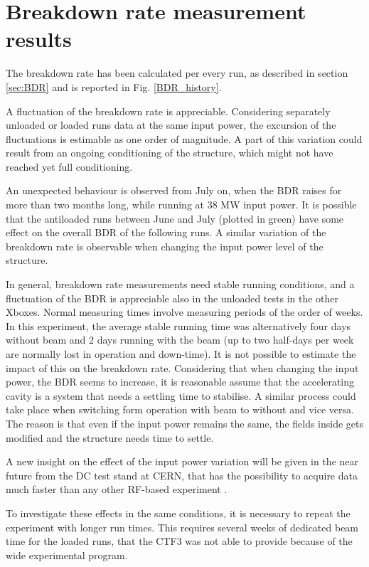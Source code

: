 \section[Breakdown rate measurement results]{Breakdown rate measurement results}

The breakdown rate has been calculated per every run, as described in section \ref{sec:BDR} and is reported in Fig. \ref{BDR_history}. 

A fluctuation of the breakdown rate is appreciable. Considering separately unloaded or loaded runs data at the same input power, the excursion of the fluctuations is estimable as one order of magnitude. A part of this variation could result from an ongoing conditioning of the structure, which might not have reached yet full conditioning.

An unexpected behaviour is observed from July on, when the BDR raises for more than two months long, while running at 38 MW input power. It is possible that the antiloaded runs between June and July (plotted in green) have some effect on the overall BDR of the following runs. A similar variation of the breakdown rate is observable when changing the input power level of the structure.

In general, breakdown rate measurements need stable running conditions, and a fluctuation of the BDR is appreciable also in the unloaded tests in the other Xboxes. Normal measuring times involve measuring periods of the order of weeks. In this experiment, the average stable running time was alternatively four days without beam and 2 days running with the beam (up to two half-days per week are normally lost in operation and down-time). It is not possible to estimate the impact of this on the breakdown rate. Considering that when changing the input power, the BDR seems to increase, it is reasonable assume that the accelerating cavity is a system that needs a settling time to stabilise. A similar process could take place when switching form operation with beam to without and vice versa. The reason is that even if the input power remains the same, the fields inside gets modified and the structure needs time to settle. 

A new insight on the effect of the input power variation will be given in the near future from the DC test stand at CERN, that has the possibility to acquire data much faster than any other RF-based experiment \cite{Walter:PC}.

To investigate these effects in the same conditions, it is necessary to repeat the experiment with longer run times. This requires several weeks of dedicated beam time for the loaded runs, that the CTF3 was not able to provide because of the wide experimental program.

